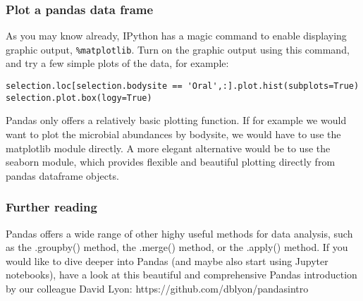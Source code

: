 \documentclass[12pt]{article}
\begin{document}
\subsubsection{Plot a pandas data frame}
As you may know already, IPython has a magic command to enable displaying graphic output, \verb|%matplotlib|. Turn on the graphic output using this command, and try a few simple plots of the data, for example: 
\begin{verbatim}
selection.loc[selection.bodysite == 'Oral',:].plot.hist(subplots=True)
selection.plot.box(logy=True)

\end{verbatim}
Pandas only offers a relatively basic plotting function. If for example we would want to plot the microbial abundances by bodysite, we would have to use the matplotlib module directly. A more elegant alternative would be to use the seaborn module, which provides flexible and beautiful plotting directly from pandas dataframe objects.

\subsubsection{Further reading}
Pandas offers a wide range of other highy useful methods for data analysis, such as the .groupby() method, the .merge() method, or the .apply() method.
If you would like to dive deeper into Pandas (and maybe also start using Jupyter notebooks), have a look at this beautiful and comprehensive Pandas introduction by our colleague David Lyon: https://github.com/dblyon/pandasintro
\end{document}
